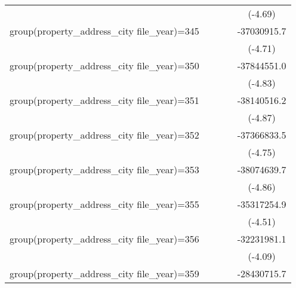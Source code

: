 {\begin{tabular}{l*{4}{c}}
                    &                     &                     &                     &     (-4.69)         \\
\addlinespace
group(property\_address\_city file\_year)=345&                     &                     &                     & -37030915.7\sym{***}\\
                    &                     &                     &                     &     (-4.71)         \\
\addlinespace
group(property\_address\_city file\_year)=350&                     &                     &                     & -37844551.0\sym{***}\\
                    &                     &                     &                     &     (-4.83)         \\
\addlinespace
group(property\_address\_city file\_year)=351&                     &                     &                     & -38140516.2\sym{***}\\
                    &                     &                     &                     &     (-4.87)         \\
\addlinespace
group(property\_address\_city file\_year)=352&                     &                     &                     & -37366833.5\sym{***}\\
                    &                     &                     &                     &     (-4.75)         \\
\addlinespace
group(property\_address\_city file\_year)=353&                     &                     &                     & -38074639.7\sym{***}\\
                    &                     &                     &                     &     (-4.86)         \\
\addlinespace
group(property\_address\_city file\_year)=355&                     &                     &                     & -35317254.9\sym{***}\\
                    &                     &                     &                     &     (-4.51)         \\
\addlinespace
group(property\_address\_city file\_year)=356&                     &                     &                     & -32231981.1\sym{***}\\
                    &                     &                     &                     &     (-4.09)         \\
\addlinespace
group(property\_address\_city file\_year)=359&                     &                     &                     & -28430715.7\sym{***}\\

\end{tabular}}
